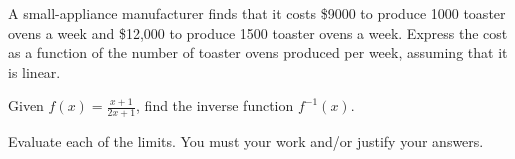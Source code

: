 \documentclass[12pt, addpoints]{exam/exam}
\newcommand{\1}{^{-1}}
\theoremstyle{plain}
\begin{document}
\begin{questions}
\newpage	
\question[2]%
A small-appliance manufacturer finds that it costs \$9000 to produce 1000 toaster ovens a week and \$12,000 to produce 1500 toaster ovens a week.  Express the cost as a function of the number of toaster ovens produced per week, assuming that it is linear. 	
\vspace{5pc}

\question[3]%
Given $f(x)=\frac{x+1}{2x+1}$, find the inverse function $f\1(x)$.
\vspace{10pc}

%	
%	
%	

\question Evaluate each of the limits.  You must your work and/or justify your answers.
\end{questions}
\end{document}
